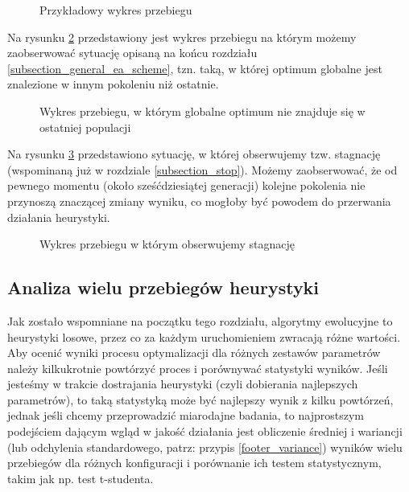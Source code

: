 \documentclass[twoside]{iisthesis}
\newcommand{\graph}[1]{}
\begin{document}
\begin{figure}[H]
	\caption{Przykładowy wykres przebiegu \label{plot_random_example}}
	\centering
	\graph{random_example.tex}
\end{figure}

Na rysunku \ref{plot_mid_opt} przedstawiony jest wykres przebiegu na którym możemy zaobserwować sytuację opisaną na końcu rozdziału \ref{subsection_general_ea_scheme}, tzn. taką, w której optimum globalne jest znalezione w innym pokoleniu niż ostatnie.

\begin{figure}[H]
	\caption{Wykres przebiegu, w którym globalne optimum nie znajduje się w ostatniej populacji \label{plot_mid_opt}}
	\centering
	\graph{mid_optimum.tex}
\end{figure}

Na rysunku \ref{plot_stagnation} przedstawiono sytuację, w której obserwujemy tzw. stagnację (wspominaną już w rozdziale \ref{subsection_stop}). Możemy zaobserwować, że od pewnego momentu (około sześćdziesiątej generacji) kolejne pokolenia nie przynoszą znaczącej zmiany wyniku, co mogłoby być powodem do przerwania działania heurystyki.

\begin{figure}[H]
	\caption{Wykres przebiegu w którym obserwujemy stagnację \label{plot_stagnation}}
	\centering
	\graph{stagnation.tex}
\end{figure}

\subsection{Analiza wielu przebiegów heurystyki}

Jak zostało wspomniane na początku tego rozdziału, algorytmy ewolucyjne to heurystyki losowe, przez co za każdym uruchomieniem zwracają różne wartości. Aby ocenić wyniki procesu optymalizacji dla różnych zestawów parametrów należy kilkukrotnie powtórzyć proces i porównywać statystyki wyników. Jeśli jesteśmy w trakcie dostrajania heurystyki (czyli dobierania najlepszych parametrów), to taką statystyką może być najlepszy wynik z kilku powtórzeń, jednak jeśli chcemy przeprowadzić miarodajne badania, to najprostszym podejściem dającym wgląd w jakość działania jest obliczenie średniej i wariancji (lub odchylenia standardowego, patrz: przypis \ref{footer_variance}) wyników wielu przebiegów dla różnych konfiguracji i porównanie ich testem statystycznym, takim jak np. test t-studenta.

\end{document}
